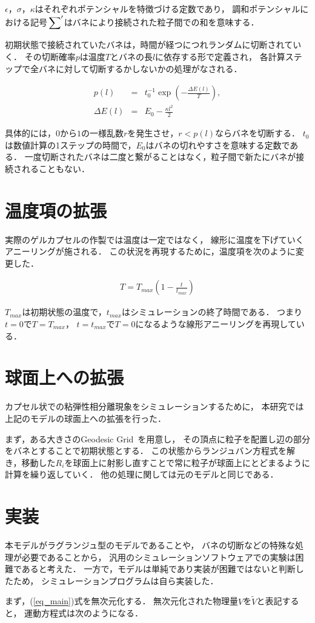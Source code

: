 $\epsilon$，$\sigma$，$\kappa$はそれぞれポテンシャルを特徴づける定数であり，
調和ポテンシャルにおける記号$\sideset{}{'}\sum$はバネにより接続された粒子間での和を意味する．

初期状態で接続されていたバネは，時間が経つにつれランダムに切断されていく．
その切断確率$p$は温度$T$とバネの長$l$に依存する形で定義され，
各計算ステップで全バネに対して切断するかしないかの処理がなされる．

\begin{eqnarray}
p(l)
&=&
t_0^{-1}
\exp\left(-\frac{\Delta E(l)}{T}\right)
,\\
\Delta E(l)
&=&
E_0-\frac{\kappa l^2}{2}
\end{eqnarray}

具体的には，$0$から$1$の一様乱数$r$を発生させ，$r<p(l)$ならバネを切断する．
$t_0$は数値計算の1ステップの時間で，$E_0$はバネの切れやすさを意味する定数である．
一度切断されたバネは二度と繋がることはなく，粒子間で新たにバネが接続されることもない．


\section{温度項の拡張}
実際のゲルカプセルの作製では温度は一定ではなく，
線形に温度を下げていくアニーリングが施される．
この状況を再現するために，温度項を次のように変更した．

\begin{eqnarray}
T = T_{max}(1-\frac{t}{t_{max}})
\end{eqnarray}

$T_{max}$は初期状態の温度で，$t_{max}$はシミュレーションの終了時間である．
つまり$t=0$で$T=T_{max}$，
$t=t_{max}$で$T=0$になるような線形アニーリングを再現している．


\section{球面上への拡張}
カプセル状での粘弾性相分離現象をシミュレーションするために，
本研究では上記のモデルの球面上への拡張を行った．

まず，ある大きさのGeodesic Grid~\cite{Geodesic}を用意し，
その頂点に粒子を配置し辺の部分をバネとすることで初期状態とする．
この状態からランジュバン方程式を解き，移動した$R_i$を球面上に射影し直すことで常に粒子が球面上にとどまるように計算を繰り返していく．
他の処理に関しては元のモデルと同じである．




\section{実装}
本モデルがラグランジュ型のモデルであることや，
バネの切断などの特殊な処理が必要であることから，
汎用のシミュレーションソフトウェアでの実験は困難であると考えた．
一方で，モデルは単純であり実装が困難ではないと判断したため，
シミュレーションプログラムは自ら実装した．

まず，(\ref{eq_main})式を無次元化する．
無次元化された物理量$V$を$\tilde{V}$と表記すると，
運動方程式は次のようになる．

